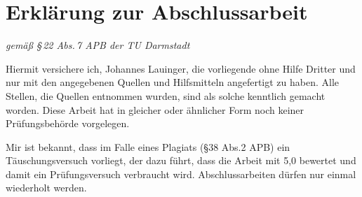 

%
%
%
%
%

 \chapter*{Erklärung zur Abschlussarbeit}
\begin{flushright}
	\emph{gemäß §\,22 Abs.\,7 APB der TU Darmstadt}
\end{flushright}
Hiermit versichere ich, Johannes Lauinger, die vorliegende \myDegree{} ohne Hilfe Dritter und nur mit den angegebenen Quellen und Hilfsmitteln angefertigt zu haben. Alle Stellen, die Quellen entnommen wurden, sind als solche kenntlich gemacht worden. Diese Arbeit hat in gleicher oder ähnlicher Form noch keiner Prüfungsbehörde vorgelegen.

Mir ist bekannt, dass im Falle eines Plagiats (§38 Abs.2 APB) ein Täuschungsversuch vorliegt, der dazu führt, dass die Arbeit mit 5,0 bewertet und damit ein Prüfungsversuch verbraucht wird. Abschlussarbeiten dürfen nur einmal wiederholt werden.

